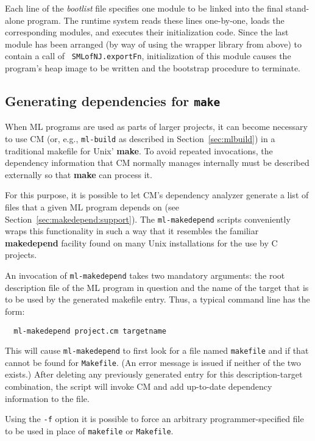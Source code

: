 Each line of the {\em bootlist} file specifies one module to be linked
into the final stand-alone program.  The runtime system reads these
lines one-by-one, loads the corresponding modules, and executes their
initialization code.  Since the last module has been arranged (by way
of using the wrapper library from above) to contain a call of {\tt
SMLofNJ.exportFn}, initialization of this module causes the program's
heap image to be written and the bootstrap procedure to terminate.

\subsection{Generating dependencies for {\tt make}}
\label{sec:makedepend}

When ML programs are used as parts of larger projects, it can become
necessary to use CM (or, e.g., {\tt ml-build} as described in
Section~\ref{sec:mlbuild}) in a traditional makefile for Unix' {\bf
make}.  To avoid repeated invocations, the dependency information that
CM normally manages internally must be described externally so that
{\bf make} can process it.

For this purpose, it is possible to let CM's dependency analyzer
generate a list of files that a given ML program depends on (see
Section~\ref{sec:makedepend:support}).  The {\tt ml-makedepend}
scripts conveniently wraps this functionality in such a way that it
resembles the familiar {\bf makedepend} facility found on many Unix
installations for the use by C projects.

An invocation of {\tt ml-makedepend} takes two mandatory arguments:
the root description file of the ML program in question and the name
of the target that is to be used by the generated makefile entry.
Thus, a typical command line has the form:

\begin{verbatim}
  ml-makedepend project.cm targetname
\end{verbatim}

This will cause {\tt ml-makedepend} to first look for a file named
{\tt makefile} and if that cannot be found for {\tt Makefile}.  (An
error message is issued if neither of the two exists.)  After deleting
any previously generated entry for this description-target
combination, the script will invoke CM and add up-to-date dependency
information to the file.

Using the {\tt -f} option it is possible to force an arbitrary
programmer-specified file to be used in place of {\tt makefile} or
{\tt Makefile}.

